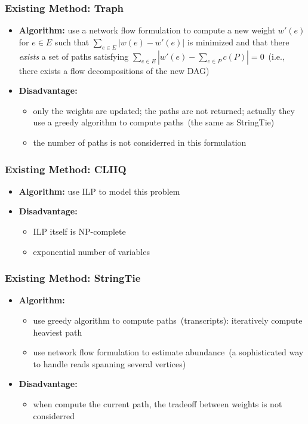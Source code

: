 \frame
{
	\frametitle{Existing Method: Traph}
	\begin{itemize}
	\item {\bf Algorithm:} use a network flow formulation to compute a new
		weight $w'(e)$ for $e\in E$ such that $\sum_{e\in E} |w(e) - w'(e)|$
		is minimized and that there \emph{exists} a set of paths satisfying
				$\sum_{e\in E} | w'(e) - \sum_{e\in P} c(P)| = 0$~(i.e.,
		there exists a flow decompositions of the new DAG)
	\vspace{0.4cm}
	\item {\bf Disadvantage:} 
		\begin{itemize}
		\item only the weights are updated; the paths are not returned; actually
			they use a greedy algorithm to compute paths~(the same as StringTie)
		\vspace{0.2cm}
		\item the number of paths is not considerred in this formulation
		\end{itemize}
	\end{itemize}
}

\frame
{
	\frametitle{Existing Method: CLIIQ}
	\begin{itemize}
	\item {\bf Algorithm:} use ILP to model this problem
	\vspace{0.5cm}
	\item {\bf Disadvantage:} 
		\begin{itemize} 
		\item ILP itself is NP-complete
		\item exponential number of variables
		\end{itemize}
	\end{itemize}
}

\frame
{
	\frametitle{Existing Method: StringTie}
	\begin{itemize}
	\item {\bf Algorithm:} 
		\begin{itemize}
		\item use greedy algorithm to compute paths~(transcripts): iteratively
			compute heaviest path
		\item use network flow formulation to estimate abundance~(a sophisticated
				way to handle reads spanning several vertices)
		\end{itemize}
	\vspace{0.5cm}
	\item {\bf Disadvantage:} 
		\begin{itemize} 
		\item when compute the current path, the tradeoff between weights is
			not considerred
		\end{itemize}
	\end{itemize}
}

